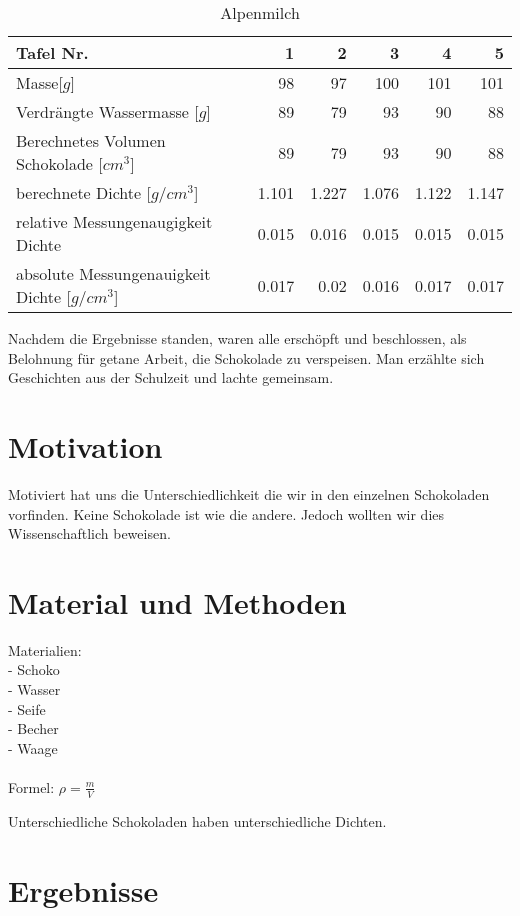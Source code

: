 \documentclass[12pt]{scrartcl}
\begin{document}
\begin{table}[h!]
	  \center
	  \caption{Alpenmilch}
      \label{tab:alpenmilch}	  
      \begin{tabular}{l|r|r|r|r|r}
      \toprule
      Tafel Nr. & 1 & 2 & 3 & 4 & 5\\
	  \midrule
      Masse[$g$] & 98 & 97 & 100 & 101 & 101\\
      \midrule
      Verdrängte Wassermasse [$g$] & 89 & 79 & 93 & 90 & 88\\
      \midrule
      Berechnetes Volumen Schokolade [$cm^3$] & 89 & 79 & 93 & 90 & 88\\
      \midrule
      berechnete Dichte [$g/cm^3$] & 1.101 & 1.227 & 1.076 & 1.122 & 1.147 \\
      \midrule
      relative Messungenaugigkeit Dichte & 0.015 & 0.016 & 0.015 & 0.015 & 0.015 \\
      \midrule
      absolute Messungenauigkeit Dichte [$g/cm^3$] & 0.017 & 0.02 & 0.016 & 0.017 & 0.017 \\
      \bottomrule
      \end{tabular}
	\end{table}
Nachdem die Ergebnisse standen, waren alle erschöpft und beschlossen, als Belohnung für getane Arbeit, die Schokolade zu verspeisen. Man erzählte sich Geschichten aus der Schulzeit und lachte gemeinsam.
\section{Motivation}
Motiviert hat uns die Unterschiedlichkeit die wir in den einzelnen Schokoladen vorfinden. Keine Schokolade ist wie die andere. Jedoch wollten wir dies Wissenschaftlich beweisen.
\section{Material und Methoden}
Materialien: \\
- Schoko \\
- Wasser \\
- Seife \\
- Becher \\
- Waage \\ \\
Formel: $\rho = \frac{m}{V}$
\pagebreak

Unterschiedliche Schokoladen haben unterschiedliche Dichten.
\section{Ergebnisse}
\end{document}
